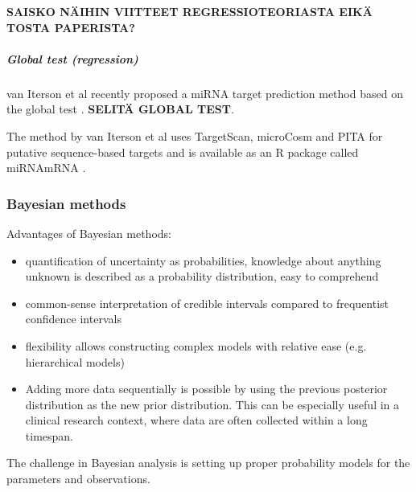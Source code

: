 \textbf{SAISKO NÄIHIN VIITTEET REGRESSIOTEORIASTA EIKÄ TOSTA PAPERISTA?}


\subparagraph{Global test (regression)}\label{global-test-regression}

van Iterson et al recently proposed a miRNA target prediction method based on
the global test \cite{vanIterson2013}. \textbf{SELITÄ GLOBAL TEST}.

The method by van Iterson et al uses TargetScan, microCosm and PITA for
putative sequence-based targets and is available as an R package called
miRNAmRNA \cite{vanItersonWeb}.





\subsubsection{Bayesian methods}\label{bayesian-methods}

Advantages of Bayesian methods:
\begin{itemize}
\tightlist
\item quantification of uncertainty as probabilities, knowledge about anything
  unknown is described as a probability distribution, easy to comprehend
\item
  common-sense interpretation of credible intervals compared to frequentist
  confidence intervals
\item
  flexibility allows constructing complex models with relative ease (e.g.
  hierarchical models)
\item
  Adding more data sequentially is possible by using the previous posterior
  distribution as the new prior distribution. This can be especially useful in
  a clinical research context, where data are often collected within a long
  timespan.
\end{itemize}
The challenge in Bayesian analysis is setting up proper probability models for
the parameters and observations. \cite{Gelman2013}

